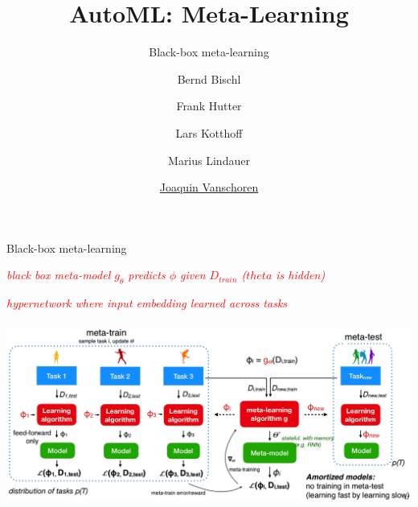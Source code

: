 
\usepackage{multimedia}

\title[Meta-Learning]{AutoML: Meta-Learning} 
\subtitle{Black-box meta-learning}
\author[Joaquin Vanschoren]{Bernd Bischl \and Frank Hutter \and Lars Kotthoff\newline \and Marius Lindauer \and \underline{Joaquin Vanschoren}}
\institute{}
\date{}


\maketitle

\begin{frame}{Black-box meta-learning}

    \centerline{\textit{\textcolor{red}{black box meta-model $g_\theta$ predicts $\phi$ given $D_{train}$ ($theta$ is hidden)}}}
    \centerline{\textit{\textcolor{red}{hypernetwork where input embedding learned across tasks}}}
    \centering\includegraphics[height=6cm]{image/img002812.jpg}
\end{frame}

